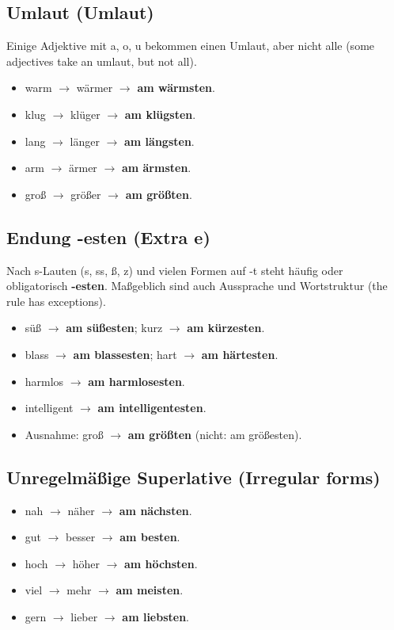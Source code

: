 \subsection{Umlaut (Umlaut)}
Einige Adjektive mit a, o, u bekommen einen Umlaut, aber nicht alle (some adjectives take an umlaut, but not all).
\begin{itemize}
\item warm $\rightarrow$ wärmer $\rightarrow$ \textbf{am wärmsten}.
\item klug $\rightarrow$ klüger $\rightarrow$ \textbf{am klügsten}.
\item lang $\rightarrow$ länger $\rightarrow$ \textbf{am längsten}.
\item arm $\rightarrow$ ärmer $\rightarrow$ \textbf{am ärmsten}.
\item groß $\rightarrow$ größer $\rightarrow$ \textbf{am größten}.
\end{itemize}
\subsection{Endung -esten (Extra e)}
Nach s-Lauten (s, ss, ß, z) und vielen Formen auf -t steht häufig oder obligatorisch \textbf{-esten}. Maßgeblich sind auch Aussprache und Wortstruktur (the rule has exceptions).
\begin{itemize}
\item süß $\rightarrow$ \textbf{am süßesten}; kurz $\rightarrow$ \textbf{am kürzesten}.
\item blass $\rightarrow$ \textbf{am blassesten}; hart $\rightarrow$ \textbf{am härtesten}.
\item harmlos $\rightarrow$ \textbf{am harmlosesten}.
\item intelligent $\rightarrow$ \textbf{am intelligentesten}.
\item Ausnahme: groß $\rightarrow$ \textbf{am größten} (nicht: am größesten).
\end{itemize}
\subsection{Unregelmäßige Superlative (Irregular forms)}
\begin{itemize}
\item nah $\rightarrow$ näher $\rightarrow$ \textbf{am nächsten}.
\item gut $\rightarrow$ besser $\rightarrow$ \textbf{am besten}.
\item hoch $\rightarrow$ höher $\rightarrow$ \textbf{am höchsten}.
\item viel $\rightarrow$ mehr $\rightarrow$ \textbf{am meisten}.
\item gern $\rightarrow$ lieber $\rightarrow$ \textbf{am liebsten}.
\end{itemize}


